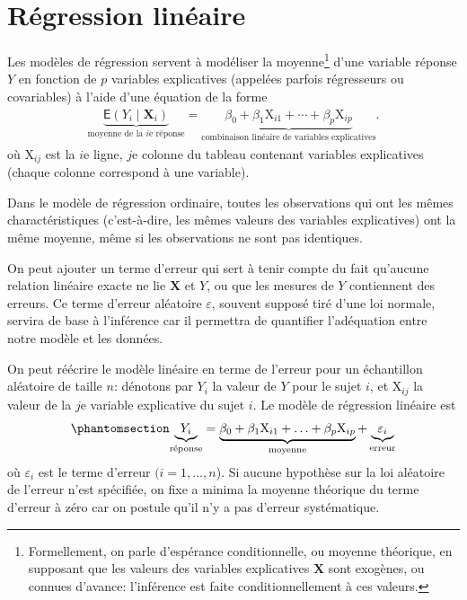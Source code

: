 \documentclass[
  11pt,
  letterpaper,
]{scrbook}
\theoremstyle{definition}
\theoremstyle{remark}
\begin{document}

\chapter{Régression linéaire}\label{regression-lineaire}

Les modèles de régression servent à modéliser la moyenne\footnote{Formellement,
  on parle d'espérance conditionnelle, ou moyenne théorique, en
  supposant que les valeurs des variables explicatives \(\mathbf{X}\)
  sont exogènes, ou connues d'avance: l'inférence est faite
  conditionnellement à ces valeurs.} d'une variable réponse \(Y\) en
fonction de \(p\) variables explicatives (appelées parfois régresseurs
ou covariables) à l'aide d'une équation de la forme \begin{align*}
\underbrace{\mathsf{E}(Y_i \mid \mathbf{X}_i)}_{\text{moyenne de la $i$e réponse}}=\underbrace{\beta_0 + \beta_1\mathrm{X}_{i1} + \cdots + \beta_p \mathrm{X}_{ip}}_{\text{combinaison linéaire de variables explicatives}}.
\end{align*} où \(\mathrm{X}_{ij}\) est la \(i\)e ligne, \(j\)e colonne
du tableau contenant variables explicatives (chaque colonne correspond à
une variable).

Dans le modèle de régression ordinaire, toutes les observations qui ont
les mêmes charactéristiques (c'est-à-dire, les mêmes valeurs des
variables explicatives) ont la même moyenne, même si les observations ne
sont pas identiques.

On peut ajouter un terme d'erreur qui sert à tenir compte du fait
qu'aucune relation linéaire exacte ne lie \(\mathbf{X}\) et \(Y\), ou
que les mesures de \(Y\) contiennent des erreurs. Ce terme d'erreur
aléatoire \(\varepsilon\), souvent supposé tiré d'une loi normale,
servira de base à l'inférence car il permettra de quantifier
l'adéquation entre notre modèle et les données.

On peut réécrire le modèle linéaire en terme de l'erreur pour un
échantillon aléatoire de taille \(n\): dénotons par \(Y_i\) la valeur de
\(Y\) pour le sujet \(i\), et \(\mathrm{X}_{ij}\) la valeur de la \(j\)e
variable explicative du sujet \(i\). Le modèle de régression linéaire
est \begin{equation}\phantomsection\label{eq-olsmean}{
\underbrace{Y_i}_{\text{réponse}} = \underbrace{\beta_0 + \beta_1 \mathrm{X}_{i1} + \ldots + \beta_p \mathrm{X}_{ip}}_{\text{moyenne}} + \underbrace{\varepsilon_{i}}_{\text{erreur}}
}\end{equation} où \(\varepsilon_i\) est le terme d'erreur
\((i=1, \ldots, n\)). Si aucune hypothèse sur la loi aléatoire de
l'erreur n'est spécifiée, on fixe a minima la moyenne théorique du terme
d'erreur à zéro car on postule qu'il n'y a pas d'erreur systématique.
\end{document}
